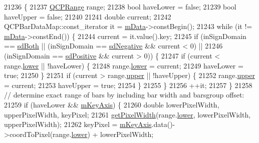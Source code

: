 \begin{DoxyCode}
21236                                                                              \{
21237   \hyperlink{class_q_c_p_range}{QCPRange} range;
21238   \textcolor{keywordtype}{bool} haveLower = \textcolor{keyword}{false};
21239   \textcolor{keywordtype}{bool} haveUpper = \textcolor{keyword}{false};
21240 
21241   \textcolor{keywordtype}{double} current;
21242   QCPBarDataMap::const\_iterator it = \hyperlink{class_q_c_p_bars_aef28d29d51ef84b608ecd22c55d531ff}{mData}->constBegin();
21243   \textcolor{keywordflow}{while} (it != \hyperlink{class_q_c_p_bars_aef28d29d51ef84b608ecd22c55d531ff}{mData}->constEnd()) \{
21244     current = it.value().key;
21245     \textcolor{keywordflow}{if} (inSignDomain == \hyperlink{class_q_c_p_abstract_plottable_a661743478a1d3c09d28ec2711d7653d8a082b98cfb91a7363a3b5cd17b0c1cd60}{sdBoth} || (inSignDomain == \hyperlink{class_q_c_p_abstract_plottable_a661743478a1d3c09d28ec2711d7653d8a0fc9a70796ef60ad18ddd18056e6dc63}{sdNegative} && current < 0) ||
21246         (inSignDomain == \hyperlink{class_q_c_p_abstract_plottable_a661743478a1d3c09d28ec2711d7653d8a02951859f243a4d24e779cfbb5471030}{sdPositive} && current > 0)) \{
21247       \textcolor{keywordflow}{if} (current < range.\hyperlink{class_q_c_p_range_aa3aca3edb14f7ca0c85d912647b91745}{lower} || !haveLower) \{
21248         range.\hyperlink{class_q_c_p_range_aa3aca3edb14f7ca0c85d912647b91745}{lower} = current;
21249         haveLower = \textcolor{keyword}{true};
21250       \}
21251       \textcolor{keywordflow}{if} (current > range.\hyperlink{class_q_c_p_range_ae44eb3aafe1d0e2ed34b499b6d2e074f}{upper} || !haveUpper) \{
21252         range.\hyperlink{class_q_c_p_range_ae44eb3aafe1d0e2ed34b499b6d2e074f}{upper} = current;
21253         haveUpper = \textcolor{keyword}{true};
21254       \}
21255     \}
21256     ++it;
21257   \}
21258   \textcolor{comment}{// determine exact range of bars by including bar width and barsgroup offset:}
21259   \textcolor{keywordflow}{if} (haveLower && \hyperlink{class_q_c_p_abstract_plottable_a426f42e254d0f8ce5436a868c61a6827}{mKeyAxis}) \{
21260     \textcolor{keywordtype}{double} lowerPixelWidth, upperPixelWidth, keyPixel;
21261     \hyperlink{class_q_c_p_bars_a794eefe4fb29b9b40583654ccbf460dc}{getPixelWidth}(range.\hyperlink{class_q_c_p_range_aa3aca3edb14f7ca0c85d912647b91745}{lower}, lowerPixelWidth, upperPixelWidth);
21262     keyPixel = \hyperlink{class_q_c_p_abstract_plottable_a426f42e254d0f8ce5436a868c61a6827}{mKeyAxis}.data()->coordToPixel(range.\hyperlink{class_q_c_p_range_aa3aca3edb14f7ca0c85d912647b91745}{lower}) + lowerPixelWidth;

\end{DoxyCode}
